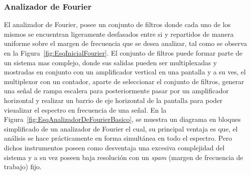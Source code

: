 \subsubsection{Analizador de Fourier }
    
    El analizador de Fourier, posee un conjunto de filtros donde cada uno de los 
    mismos se encuentran ligeramente desfasados entre si y repartidos de manera 
    uniforme sobre el margen de frecuencia que se desea analizar, tal como se observa
    en la Figura~\ref{fig:EsqInicialFourier}. El conjunto de filtros puede formar 
    parte de un sistema mas complejo, donde sus salidas pueden ser multiplexadas 
    y mostradas en conjunto con un amplificador vertical en una pantalla y a su ves, 
    el multiplexor con un contador, aparte de seleccionar el conjunto de filtros, 
    generar una señal de rampa escalera para posteriormente pasar por un 
    amplificador horizontal y realizar un barrio de eje horizontal de la pantalla 
    para poder visualizar el espectro en frecuencia de una señal. En la 
    Figura~\ref{fig:EsqAnalizadorDeFourierBasico}, se muestra un diagrama en bloques 
    simplificado de un analizador de Fourier el cual, su principal 
    ventaja es que, el análisis se hace prácticamente en forma simultánea en todo 
    el espectro. Pero dichos instrumentos poseen como desventaja una excesiva 
    complejidad del sistema y a su vez poseen baja resolución con un \textit{spam} 
    (margen de frecuencia de trabajo) fijo.
